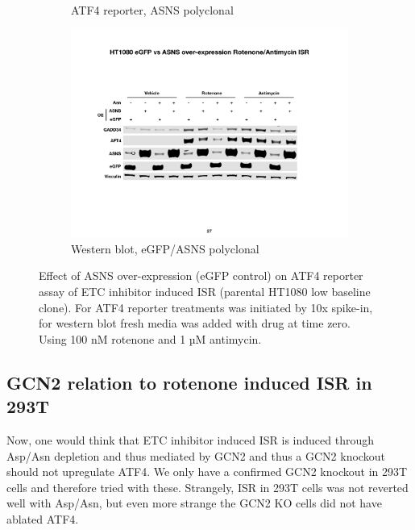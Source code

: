 \begin{figure}
\begin{subfigure}[b]{0.49\textwidth}
         \caption{ATF4 reporter, ASNS polyclonal}
         \label{fig:sapp:ISR:HT1080_ATF4rep_ASNS_OE}
     \end{subfigure}
     \hfill
     \begin{subfigure}[b]{0.6\textwidth}
         \centering
         \includegraphics[width=\textwidth]{figures/sapp/ISR/HT1080_ISR_ASNS_OE.pdf}
         \caption{Western blot, eGFP/ASNS polyclonal}
         \label{fig:sapp:ISR:HT1080_ISR_ASNS_OE}
     \end{subfigure}
        \caption[ASNS OE, rotenone/antimycin induced ISR]{
        Effect of ASNS over-expression (eGFP control) on ATF4 reporter assay of ETC inhibitor induced ISR (parental HT1080 low baseline clone).
        For ATF4 reporter treatments was initiated by 10x spike-in, for western blot fresh media was added with drug at time zero.
        Using 100 nM rotenone and 1 µM antimycin.
        }
        \label{fig:sapp:ISR:ASNS_ISR}
\end{figure}






\FloatBarrier
\subsection{GCN2 relation to rotenone induced ISR in 293T}
Now, one would think that ETC inhibitor induced ISR is induced through Asp/Asn depletion and thus mediated by GCN2 and thus a GCN2 knockout should not upregulate ATF4.
We only have a confirmed GCN2 knockout in 293T cells and therefore tried with these.
Strangely, ISR in 293T cells was not reverted well with Asp/Asn, but even more strange the GCN2 KO cells did not have ablated ATF4.

